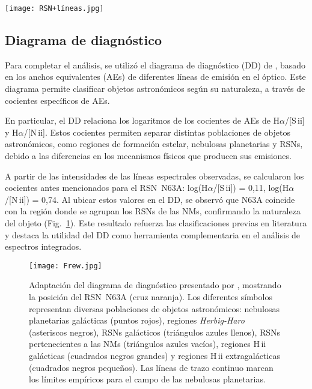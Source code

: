 \documentclass[baaa]{baaa}
\begin{document}
\begin{figure*}[!ht]
\centering
\texttt{[image: RSN+líneas.jpg]}  %
\caption{Comparación entre el espectro integrado del 
RSN~N63A y un \textit{template} con un rango de edad (3-5$\times$10$^{6}$~años) y un \(E(B-V) = 0,20\pm 0,05\) \citep{Santos+1995}.
}
\label{F4}
\end{figure*}


\subsection{Diagrama de diagnóstico}
Para completar el análisis, se utilizó el diagrama de diagnóstico (DD) de \cite{Frew+2010}, basado en los anchos equivalentes (AEs) de diferentes líneas de emisión en el óptico. Este diagrama permite clasificar objetos astronómicos según su naturaleza, a través de cocientes específicos de AEs. 

En particular, el DD relaciona los logaritmos de los cocientes de AEs de H$\alpha$/[S\,{\sc ii}] y H$\alpha$/[N\,{\sc ii}]. Estos cocientes permiten separar distintas poblaciones de objetos astronómicos, como regiones de formación estelar, nebulosas planetarias y RSNs, debido a las diferencias en los mecanismos físicos que producen sus emisiones. 

A partir de las intensidades de las líneas espectrales observadas, se calcularon los cocientes antes mencionados para el RSN~N63A:
log(H$\alpha$/[S\,{\sc ii}]) = 0,11, 
log(H$\alpha$/[N\,{\sc ii}]) = 0,74. 
Al ubicar estos valores en el DD, se observó que N63A coincide con la región donde se agrupan los RSNs de las NMs, confirmando la naturaleza del objeto (Fig.~\ref{F5}).
Este resultado refuerza las clasificaciones previas en literatura y destaca la utilidad del DD como herramienta complementaria en el análisis de espectros integrados. 

\begin{figure}[!ht]
\centering
\texttt{[image: Frew.jpg]} 
\caption{Adaptación del diagrama de diagnóstico presentado por \cite{Frew+2010}, mostrando la posición del RSN~N63A (cruz naranja). Los diferentes símbolos representan diversas poblaciones de objetos astronómicos:  nebulosas planetarias galácticas (puntos rojos), regiones \textit{Herbig-Haro} (asteriscos negros), RSNs galácticos (triángulos azules llenos),  RSNs pertenecientes a las NMs (triángulos azules vacíos), regiones H\,{\sc ii} galácticas (cuadrados negros grandes) y regiones H\,{\sc ii} extragalácticas (cuadrados negros pequeños). Las líneas de trazo continuo marcan los límites empíricos para el campo de las nebulosas planetarias.
}
\label{F5}
\end{figure}
\end{document}

